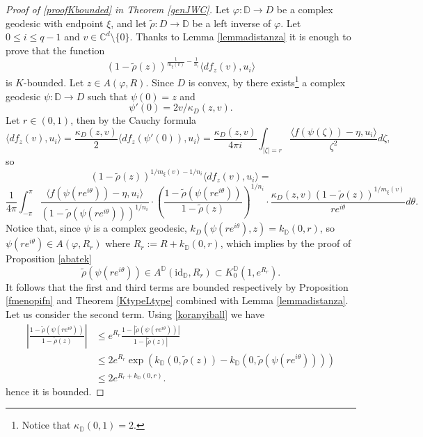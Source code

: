 \documentclass[11pt, reqno]{amsart}
\numberwithin{equation}{section}
\theoremstyle{definition}
\newcommand{\C}{\mathbb{C}}
\newcommand{\D}{\mathbb{D}}
\newcommand{\id}{\mathrm{id}}
\begin{document}
{{{		\begin{proof}[Proof of \eqref{proofKbounded} in Theorem \ref{genJWC}]
			Let $\varphi\colon \D\to D$ be a complex geodesic with endpoint $\xi$, and let $\tilde \rho\colon D\to \D$ be a left inverse of $\varphi$.
			Let  $0\leq i\leq q-1$ and  $v\in \C^d\setminus\{0\}.$
			Thanks to Lemma \ref{lemmadistanza} it is enough to prove that the function
			$$(1-\tilde \rho(z))^{\frac{1}{m_\xi(v)}-\frac{1}{n_i}}\langle df_z(v),u_i\rangle$$ is $K$-bounded.
			Let $z\in A(\varphi, R)$.
			Since $D$ is convex, by  \cite[Lemma 11.1.2, Proposition 11.1.4, Theorem 11.2.1]{JarPfl} there exists\footnote{Notice that $\kappa_\D(0,1)=2$.} a  complex geodesic  $\psi\colon\D\to D$ such that $\psi(0)=z$ and  $$\psi'(0)=2v\slash \kappa_D(z,v).$$
			Let $r\in(0,1)$, then by the Cauchy formula
			$$\langle df_z(v),u_i\rangle=\frac{\kappa_D(z,v)}{2}\langle df_z(\psi'(0)),u_i\rangle=\frac{\kappa_D(z,v)}{4\pi i}\int_{|\zeta|=r}\frac{\langle f(\psi(\zeta))-\eta,u_i \rangle}{\zeta^2}d\zeta,$$
			so
			$$(1-\tilde{\rho}(z))^{1/m_\xi(v)-1/n_i}\langle df_z(v),u_i\rangle=$$$$\frac{1}{4\pi}\int_{-\pi}^{\pi}\frac{\langle f(\psi(re^{i\theta}))-\eta,u_i \rangle}{(1-\tilde{\rho}(\psi(re^{i\theta})))^{1/n_i}}\cdot\left(\frac{1-\tilde{\rho}(\psi(re^{i\theta}))}{1-\tilde{\rho}(z)}\right)^{1/n_i}\cdot\frac{\kappa_D(z,v)(1-\tilde{\rho}(z))^{1/m_\xi(v)}}{re^{i\theta}}d\theta.$$
			Notice that, since $\psi$ is a complex geodesic, $k_D(\psi(re^{i\theta}),z)=k_\D(0,r)$, so $\psi(re^{i\theta})\in A(\varphi,R_r)$ where $R_r:=R+k_\D(0,r)$, which implies by the proof of Proposition \ref{abatek}
			$$\tilde{\rho}(\psi(re^{i\theta}))\in A^\D(\id_\D,R_r)\subset K^\D_0(1,e^{R_r}).$$
			It follows that the first and third terms are bounded respectively by Proposition \ref{fmenopifn} and Theorem \ref{KtypeLtype} combined with Lemma \ref{lemmadistanza}.
			Let us consider the second term. Using \eqref{koranyiball} we have 
			\begin{align*}\label{rhozrhopsi}\left|\frac{1-\tilde{\rho}(\psi(re^{i\theta}))}{1-\tilde{\rho}(z)}\right|&\leq e^{R_r}\frac{1-|\tilde{\rho}(\psi(re^{i\theta}))|}{1-|\tilde{\rho}(z)|}\\&\leq2e^{R_r}\exp(k_\D(0,\tilde{\rho}(z))-k_\D(0,\tilde{\rho}(\psi(re^{i\theta}))))\\&\leq 2e^{R_r+k_\D(0,r)}.\end{align*}
			hence it is bounded.
		\end{proof}
}}}
\end{document}
